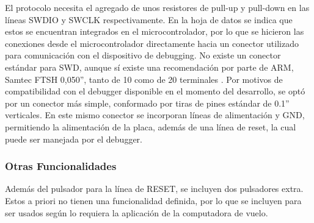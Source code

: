 
El protocolo necesita el agregado de unos resistores de pull-up y pull-down en las líneas SWDIO y SWCLK respectivamente. En la hoja de datos se indica que estos se encuentran integrados en el microcontrolador, por lo que se hicieron las conexiones desde el microcontrolador directamente hacia un conector utilizado para comunicación con el dispositivo de debugging. No existe un conector estándar para SWD, aunque sí existe una recomendación por parte de ARM, Samtec FTSH 0,050'', tanto de 10 como de 20 terminales \cite{ARM_SWD_connector}. Por motivos de compatibilidad con el debugger disponible en el momento del desarrollo, se optó por un conector más simple, conformado por tiras de pines estándar de 0.1” verticales. En este mismo conector se incorporan líneas de alimentación y GND, permitiendo la alimentación de la placa, además de una línea de reset, la cual puede ser manejada por el debugger.


\subsubsection{Otras Funcionalidades}

Además del pulsador para la línea de RESET, se incluyen dos pulsadores extra. Estos a priori no tienen una funcionalidad definida, por lo que se incluyen para ser usados según lo requiera la aplicación de la computadora de vuelo.

